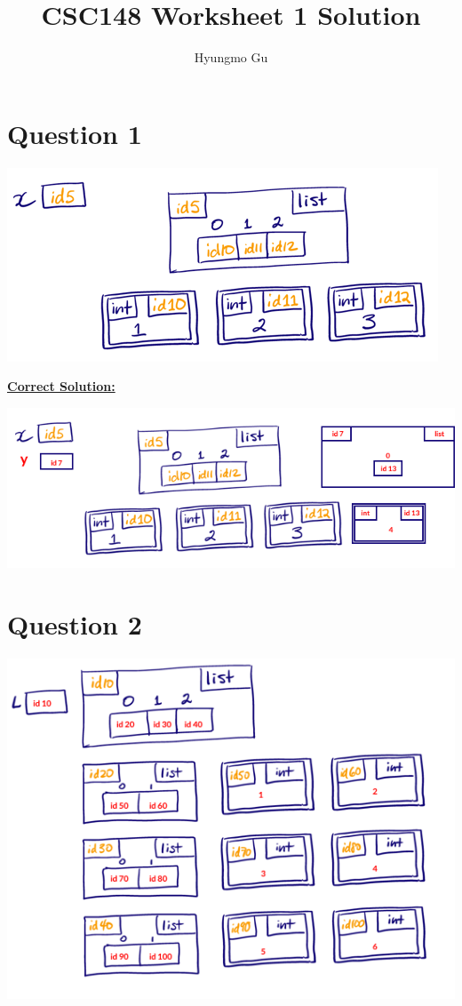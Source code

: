 \documentclass[12pt]{article}
\begin{document}
\title{CSC148 Worksheet 1 Solution}
\author{Hyungmo Gu}
\maketitle

\section*{Question 1}
\begin{center}
\includegraphics[width=0.5\linewidth]{images/worksheet_1_q1_solution.png}
\end{center}

\bigskip

\begin{mdframed}
    \underline{\textbf{Correct Solution:}}

    \bigskip

    \begin{center}
    \includegraphics[width=0.8\linewidth]{images/worksheet_1_q1_correction.png}
    \end{center}

\end{mdframed}


\section*{Question 2}
\begin{center}
\includegraphics[width=0.5\linewidth]{images/worksheet_1_q2_solution.png}
\end{center}
\end{document}
